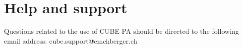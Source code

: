 
\clearpage
\section{Help and support}
\label{bkm:Ref443502661}

Questions related to the use of CUBE PA should be directed to the following email address: {\color{red} cube.support@emchberger.ch}

